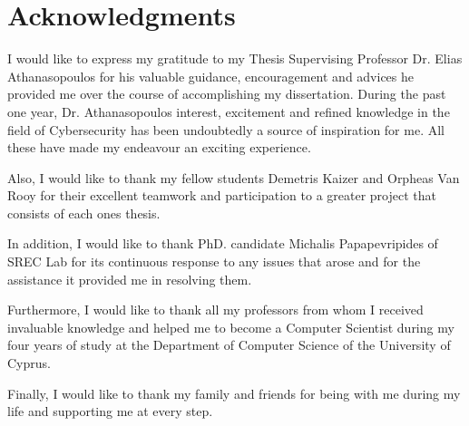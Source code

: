 \section*{\LARGE{Acknowledgments}}

I would like to express my gratitude to my Thesis Supervising Professor Dr. Elias Athanasopoulos for his valuable guidance, encouragement and advices he provided me over the course of accomplishing my dissertation. During the past one year, Dr. Athanasopoulos interest, excitement and refined knowledge in the field of Cybersecurity has been undoubtedly a source of inspiration for me. All these have made my endeavour an exciting experience. 

Also, I would like to thank my fellow students Demetris Kaizer and Orpheas Van Rooy for their excellent teamwork and participation to a greater project that consists of each ones thesis.

In addition, I would like to thank PhD. candidate Michalis Papapevripides of SREC Lab for its continuous response to any issues that arose and for the assistance it provided me in resolving them.

Furthermore, I would like to thank all my professors from whom I received invaluable knowledge and helped me to become a Computer Scientist during my four years of study at the Department of Computer Science of the University of Cyprus.

Finally, I would like to thank my family and friends for being with me during my life and
supporting me at every step.